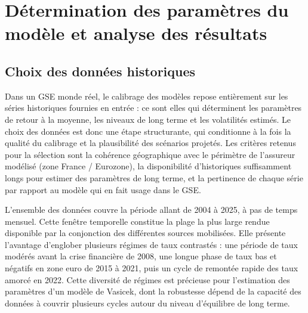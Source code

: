 \chapter{Détermination des paramètres du modèle et analyse des résultats}
\label{chap:dedetermination_des_parametres_et_analyse_des_resultats}


\section{Choix des données historiques}

Dans un GSE monde réel, le calibrage des modèles repose entièrement sur les séries historiques fournies en entrée : ce sont elles qui déterminent les paramètres de retour à la moyenne, les niveaux de long terme et les volatilités estimés. Le choix des données est donc une étape structurante, qui conditionne à la fois la qualité du calibrage et la plausibilité des scénarios projetés. Les critères retenus pour la sélection sont la cohérence géographique avec le périmètre de l'assureur modélisé (zone France / Eurozone), la disponibilité d'historiques suffisamment longs pour estimer des paramètres de long terme, et la pertinence de chaque série par rapport au modèle qui en fait usage dans le GSE.

L'ensemble des données couvre la période allant de 2004 à 2025, à pas de temps mensuel. Cette fenêtre temporelle constitue la plage la plus large rendue disponible par la conjonction des différentes sources mobilisées. Elle présente l'avantage d'englober plusieurs régimes de taux contrastés : une période de taux modérés avant la crise financière de 2008, une longue phase de taux bas et négatifs en zone euro de 2015 à 2021, puis un cycle de remontée rapide des taux amorcé en 2022. Cette diversité de régimes est précieuse pour l'estimation des paramètres d'un modèle de Vasicek, dont la robustesse dépend de la capacité des données à couvrir plusieurs cycles autour du niveau d'équilibre de long terme.

